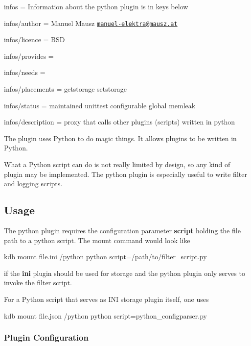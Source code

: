 
\begin{DoxyItemize}
\item infos = Information about the python plugin is in keys below
\item infos/author = Manuel Mausz \href{mailto:manuel-elektra@mausz.at}{\tt manuel-\/elektra@mausz.\+at}
\item infos/licence = B\+SD
\item infos/provides =
\item infos/needs =
\item infos/placements = getstorage setstorage
\item infos/status = maintained unittest configurable global memleak
\item infos/description = proxy that calls other plugins (scripts) written in python
\end{DoxyItemize}

The plugin uses Python to do magic things. It allows plugins to be written in Python.

What a Python script can do is not really limited by design, so any kind of plugin may be implemented. The python plugin is especially useful to write filter and logging scripts.

\subsection*{Usage}

The python plugin requires the configuration parameter {\bfseries script} holding the file path to a python script. The mount command would look like


\begin{DoxyCode}
kdb mount file.ini /python python script=/path/to/filter\_script.py
\end{DoxyCode}


if the {\bfseries ini} plugin should be used for storage and the python plugin only serves to invoke the filter script.

For a Python script that serves as I\+NI storage plugin itself, one uses


\begin{DoxyCode}
kdb mount file.json /python python script=python\_configparser.py
\end{DoxyCode}


\subsubsection*{Plugin Configuration}

